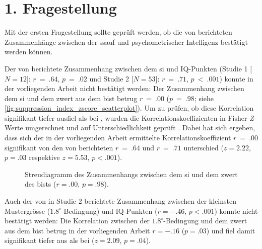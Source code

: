 \documentclass[11pt, twoside, a4paper]{book}		%
\begin{document}
\clearpage
\section{1. Fragestellung}

Mit der ersten Fragestellung sollte geprüft werden, ob die von \citet{Melnick2013} berichteten Zusammenhänge zwischen der \gls{ssauf} und psychometrischer Intelligenz bestätigt werden können. 

Der von \citet{Melnick2013} berichtete Zusammenhang zwischen dem \gls{si} und IQ-Punkten (Studie 1 [$N=12$]: $r~=~.64$, $p~=~.02$ und Studie 2 [$N=53$]: $r~=~.71$, $p~<~.001$) konnte in der vorliegenden Arbeit nicht bestätigt werden: Der Zusammenhang zwischen dem \gls{si} und dem \gls{zwert} aus dem \gls{bist} betrug $r~=~.00$ ($p~=~.98$; siehe \autoref{fig:suppression_index_zscore_scatterplot}). 
Um zu prüfen, ob diese Korrelation signifikant tiefer ausfiel als bei \citeauthor{Melnick2013}, wurden die Korrelationskoeffizienten in Fisher-\textit{Z}-Werte umgerechnet und  auf Unterschiedlichkeit geprüft \citep[][S. 54]{Cohen1983}. 
Dabei hat sich ergeben, dass sich der in der vorliegenden Arbeit ermittelte Korrelationskoeffizient $r~=~.00$ signifikant von den von \citet{Melnick2013} berichteten $r~=~.64$ und $r~=~.71$ unterschied ($z=2.22$, $p=.03$ respektive $z=5.53$, $p<.001$).

\begin{figure}[t]
	\centering
	\begin{adjustbox}{width=1\textwidth}
		
	\end{adjustbox}
	\caption[Zusammenhang zwischen dem \gls{si} und \gls{zwert} des \gls{bist}s]{Streudiagramm des Zusammenhangs zwischen dem \gls{si} und dem \gls{zwert} des \gls{bist}s ($r=.00$, $p=.98$).}
	\label{fig:suppression_index_zscore_scatterplot}
\end{figure}

Auch der von \citet{Melnick2013} in Studie 2 berichtete Zusammenhang zwischen der kleinsten Mustergrösse ($1.8^{\circ}$-Bedingung) und IQ-Punkten ($r=-.46$, $p<.001$) konnte nicht bestätigt werden: Die Korrelation zwischen der $1.8^{\circ}$-Bedingung und dem \gls{zwert} aus dem \gls{bist} betrug in der vorliegenden Arbeit $r=-.16$ ($p=.03$) und fiel damit signifikant tiefer aus als bei \citeauthor{Melnick2013} ($z=2.09$, $p=.04$).
\end{document}
